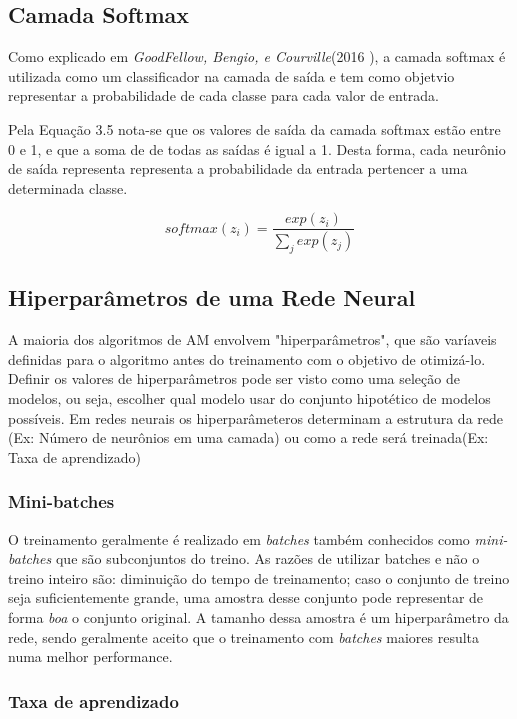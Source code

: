 \subsection{Camada Softmax}

Como explicado em \textit{GoodFellow, Bengio, e Courville}(2016 \cite{Goodfellow2016}), a camada softmax é utilizada como um classificador na camada de saída e tem como objetvio representar a probabilidade de cada classe para cada valor de entrada.

Pela Equação 3.5 nota-se que os valores de saída da camada softmax estão entre 0 e 1, e que a soma de de todas as saídas é igual a 1. Desta forma, cada neurônio de saída representa representa a probabilidade da entrada pertencer a uma determinada classe.

\begin{equation}
softmax(z_i) = \frac{exp(z_i)}{\sum_{j}^{} exp(z_j)}
\end{equation}


\subsection{Hiperparâmetros de uma Rede Neural}
A maioria dos algoritmos de AM envolvem "hiperparâmetros", que são varíaveis definidas para o algoritmo antes do treinamento com o objetivo de otimizá-lo. Definir os valores de hiperparâmetros pode ser visto como uma seleção de modelos, ou seja, escolher qual modelo usar do conjunto hipotético de modelos possíveis. Em redes neurais os hiperparâmeteros determinam a estrutura da rede (Ex: Número de neurônios em uma camada) ou como a rede será treinada(Ex: Taxa de aprendizado)

\subsubsection{Mini-batches}
O treinamento geralmente é realizado em \textit{batches} também conhecidos como \textit{mini-batches} que são subconjuntos do treino. As razões de utilizar batches e não o treino inteiro são: diminuição do tempo de treinamento; caso o conjunto de treino seja suficientemente grande, uma amostra desse conjunto pode representar de forma \textit{boa} o conjunto original. A tamanho dessa amostra é um hiperparâmetro da rede, sendo geralmente aceito que o treinamento com \textit{batches} maiores resulta numa melhor performance.

\subsubsection{Taxa de aprendizado}

